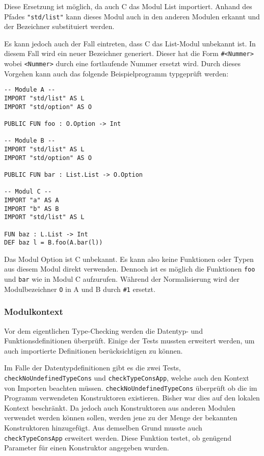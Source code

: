 \documentclass[runningheads]{llncs}
\begin{document}
Diese Ersetzung ist möglich, da auch C das Modul List importiert. Anhand des Pfades \verb|"std/list"| kann dieses Modul auch in den anderen Modulen erkannt und der Bezeichner substituiert werden.

Es kann jedoch auch der Fall eintreten, dass C das List-Modul unbekannt ist. In diesem Fall wird ein neuer Bezeichner generiert. Dieser hat die Form \verb|#<Nummer>| wobei \verb|<Nummer>| durch eine fortlaufende Nummer ersetzt wird. Durch dieses Vorgehen kann auch das folgende Beispielprogramm typgeprüft werden:


\begin{verbatim}
-- Module A --
IMPORT "std/list" AS L
IMPORT "std/option" AS O

PUBLIC FUN foo : O.Option -> Int

-- Module B --
IMPORT "std/list" AS L
IMPORT "std/option" AS O

PUBLIC FUN bar : List.List -> O.Option

-- Modul C --
IMPORT "a" AS A
IMPORT "b" AS B
IMPORT "std/list" AS L

FUN baz : L.List -> Int
DEF baz l = B.foo(A.bar(l))
\end{verbatim}

Das Modul Option ist C unbekannt. Es kann also keine Funktionen oder Typen aus diesem Modul direkt verwenden. Dennoch ist es möglich die Funktionen \verb|foo| und \verb|bar| wie in Modul C aufzurufen. Während der Normalisierung wird der Modulbezeichner \verb|O| in A und B durch \verb|#1| ersetzt.

\subsubsection{Modulkontext}

Vor dem eigentlichen Type-Checking werden die Datentyp- und Funktionsdefinitionen überprüft. Einige der Tests mussten erweitert werden, um auch importierte Definitionen berücksichtigen zu können.

Im Falle der Datentypdefinitionen gibt es die zwei Tests, \verb|checkNoUndefinedTypeCons| und \verb|checkTypeConsApp|, welche auch den Kontext von Importen beachten müssen. \verb|checkNoUndefinedTypeCons| überprüft ob die im Programm verwendeten Konstruktoren existieren. Bisher war dies auf den lokalen Kontext beschränkt. Da jedoch auch Konstruktoren aus anderen Modulen verwendet werden können sollen, werden jene zu der Menge der bekannten Konstruktoren hinzugefügt. Aus demselben Grund musste auch \verb|checkTypeConsApp| erweitert werden. Diese Funktion testet, ob genügend Parameter für einen Konstruktor angegeben wurden.
\end{document}
